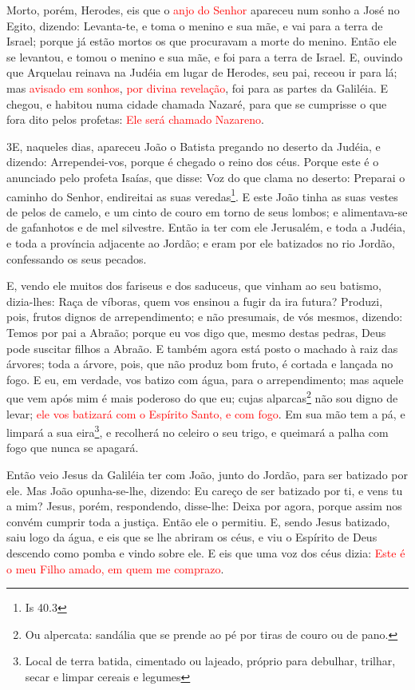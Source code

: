 Morto, porém, Herodes, eis que o \textcolor{red}{anjo do Senhor} apareceu
num sonho a José no Egito, dizendo: Levanta-te, e toma o
menino e sua mãe, e vai para a terra de Israel; porque já estão
mortos os que procuravam a morte do menino. Então ele se
levantou, e tomou o menino e sua mãe, e foi para a terra de Israel.
E, ouvindo que Arquelau reinava na Judéia em lugar de
Herodes, seu pai, receou ir para lá; mas \textcolor{red}{avisado em sonhos},
\textcolor{red}{por divina revelação}, foi para as partes da Galiléia.
E chegou, e habitou numa cidade chamada Nazaré, para que se
cumprisse o que fora dito pelos profetas: \textcolor{red}{Ele será chamado
Nazareno}.

\medskip

\lettrine{3} E, naqueles dias, apareceu João o Batista
pregando no deserto da Judéia, e dizendo: Arrependei-vos, porque
é chegado o reino dos céus. Porque este é o anunciado pelo
profeta Isaías, que disse: Voz do que clama no deserto: Preparai o
caminho do Senhor, endireitai as suas veredas\footnote{Is 40.3}.
E este João tinha as suas vestes de pelos de camelo, e um cinto
de couro em torno de seus lombos; e alimentava-se de gafanhotos e de
mel silvestre. Então ia ter com ele Jerusalém, e toda a Judéia,
e toda a província adjacente ao Jordão; e eram por ele batizados
no rio Jordão, confessando os seus pecados.

E, vendo ele muitos dos fariseus e dos saduceus, que vinham ao seu
batismo, dizia-lhes: Raça de víboras, quem vos ensinou a fugir da
ira futura? Produzi, pois, frutos dignos de arrependimento;
e não presumais, de vós mesmos, dizendo: Temos por pai a Abraão;
porque eu vos digo que, mesmo destas pedras, Deus pode suscitar
filhos a Abraão. E também agora está posto o machado à raiz
das árvores; toda a árvore, pois, que não produz bom fruto, é
cortada e lançada no fogo. E eu, em verdade, vos batizo com
água, para o arrependimento; mas aquele que vem após mim é mais
poderoso do que eu; cujas alparcas\footnote{Ou alpercata: sandália
que se prende ao pé por tiras de couro ou de pano.} não sou digno de
levar; \textcolor{red}{ele vos batizará com o Espírito Santo, e com fogo}.
Em sua mão tem a pá, e limpará a sua eira\footnote{Local de
terra batida, cimentado ou lajeado, próprio para debulhar, trilhar,
secar e limpar cereais e legumes }, e recolherá no celeiro o seu
trigo, e queimará a palha com fogo que nunca se apagará.

Então veio Jesus da Galiléia ter com João, junto do Jordão, para
ser batizado por ele. Mas João opunha-se-lhe, dizendo: Eu
careço de ser batizado por ti, e vens tu a mim? Jesus, porém,
respondendo, disse-lhe: Deixa por agora, porque assim nos convém
cumprir toda a justiça. Então ele o permitiu. E, sendo Jesus
batizado, saiu logo da água, e eis que se lhe abriram os céus, e viu
o Espírito de Deus descendo como pomba e vindo sobre ele. E
eis que uma voz dos céus dizia: \textcolor{red}{Este é o meu Filho amado, em
quem me comprazo}.

